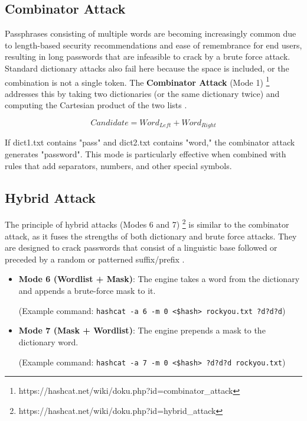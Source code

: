 \subsection{Combinator Attack}

Passphrases consisting of multiple words are becoming increasingly common due to length-based security recommendations and ease of remembrance for end users, resulting in long passwords that are infeasible to crack by a brute force attack. Standard dictionary attacks also fail here because the space is included, or the combination is not a single token. The \textbf{Combinator Attack} (Mode 1) \footnote{https://hashcat.net/wiki/doku.php?id=combinator\_attack} addresses this by taking two dictionaries (or the same dictionary twice) and computing the Cartesian product of the two lists \cite{hashcat_wiki}.

\begin{equation}
    Candidate = Word_{Left} + Word_{Right}
\end{equation}

If dict1.txt contains "pass" and dict2.txt contains "word," the combinator attack generates "password". This mode is particularly effective when combined with rules that add separators, numbers, and other special symbols.

\subsection{Hybrid Attack}

The principle of hybrid attacks (Modes 6 and 7) \footnote{https://hashcat.net/wiki/doku.php?id=hybrid\_attack} is similar to the combinator attack, as it fuses the strengths of both dictionary and brute force attacks. They are designed to crack passwords that consist of a linguistic base followed or preceded by a random or patterned suffix/prefix \cite{hashcat_wiki}.

\begin{itemize}
    \item \textbf{Mode 6 (Wordlist + Mask)}: The engine takes a word from the dictionary and appends a brute-force mask to it.
    
 (Example command: \verb|hashcat -a 6 -m 0 <$hash> rockyou.txt ?d?d?d|)

    \item \textbf{Mode 7 (Mask + Wordlist)}: The engine prepends a mask to the dictionary word.
    
 (Example command: \verb|hashcat -a 7 -m 0 <$hash> ?d?d?d rockyou.txt|)
\end{itemize}



